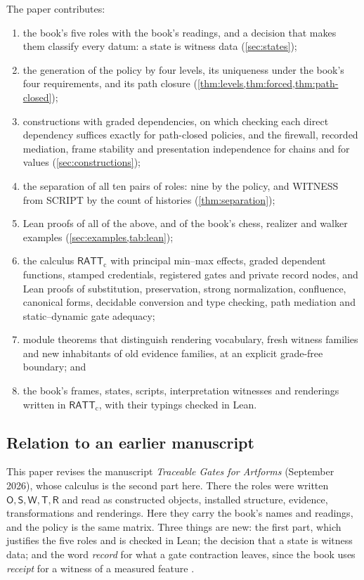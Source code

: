\documentclass[11pt]{article}
\numberwithin{equation}{section}
\theoremstyle{definition}
\theoremstyle{plain}
\theoremstyle{remark}
\newcommand{\RATT}{\mathsf{RATT}_{\mathrm c}}
\newcommand{\WIT}{\textsf{WITNESS}}
\newcommand{\SCR}{\textsf{SCRIPT}}
\begin{document}
The paper contributes:
\begin{enumerate}[label=(\roman*),leftmargin=2.5em]
\item the book's five roles with the book's readings, and a decision that
makes them classify every datum: a state is witness data
(\cref{sec:states});
\item the generation of the policy by four levels, its uniqueness under the
book's four requirements, and its path closure
(\cref{thm:levels,thm:forced,thm:path-closed});
\item constructions with graded dependencies, on which checking each direct
dependency suffices exactly for path-closed policies, and the firewall,
recorded mediation, frame stability and presentation independence for
chains and for values (\cref{sec:constructions});
\item the separation of all ten pairs of roles: nine by the policy, and
\WIT{} from \SCR{} by the count of histories (\cref{thm:separation});
\item Lean proofs of all of the above, and of the book's chess, realizer and
walker examples (\cref{sec:examples,tab:lean});
\item the calculus \(\RATT\) with principal min--max effects, graded dependent
functions, stamped credentials, registered gates and private record nodes,
and Lean proofs of substitution, preservation, strong normalization,
confluence, canonical forms, decidable conversion and type checking, path
mediation and static--dynamic gate adequacy;
\item module theorems that distinguish rendering vocabulary, fresh witness
families and new inhabitants of old evidence families, at an explicit
grade-free boundary; and
\item the book's frames, states, scripts, interpretation witnesses and
renderings written in \(\RATT\), with their typings checked in Lean.
\end{enumerate}

\subsection{Relation to an earlier manuscript}

This paper revises the manuscript \emph{Traceable Gates for Artforms}
(September 2026), whose calculus is the second part here.  There the roles
were written \(\mathsf O,\mathsf S,\mathsf W,\mathsf T,\mathsf R\) and read as
constructed objects, installed structure, evidence, transformations and
renderings.  Here they carry the book's names and readings, and the policy is
the same matrix.  Three things are new: the first part, which justifies the
five roles and is checked in Lean; the decision that a state is witness data;
and the word \emph{record} for what a gate contraction leaves, since the book
uses \emph{receipt} for a witness of a measured feature
\cite[Prop.~3.43]{Book}.
\end{document}
